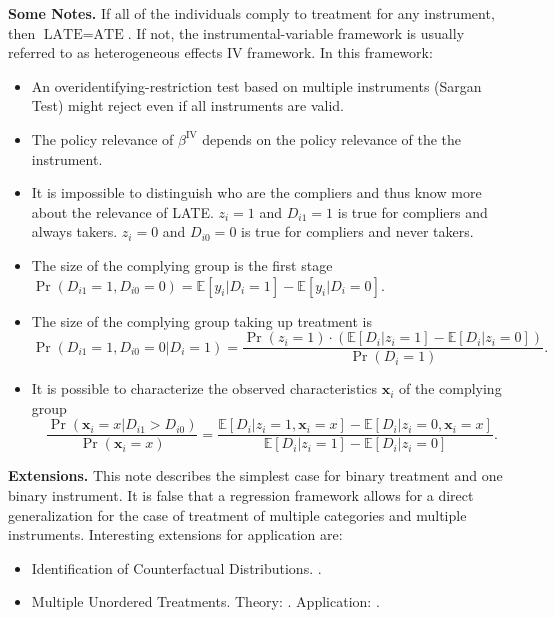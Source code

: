 \noindent \textbf{Some Notes.} If all of the individuals comply to treatment for any instrument, then $\text{LATE} =\text{ATE}$. If not, the instrumental-variable framework is usually referred to as heterogeneous effects IV framework. In this framework: 
\begin{itemize}
\item An overidentifying-restriction test based on multiple instruments (Sargan Test) might reject even if all instruments are valid. 
\item The policy relevance of $\beta^{\text{IV}}$ depends on the policy relevance of the the instrument. 
\item It is impossible to distinguish who are the compliers and thus know more about the relevance of LATE. $z_{i} = 1$ and $D_{i1} = 1$ is true for compliers and always takers. $z_{i} = 0$ and $D_{i0} = 0$ is true for compliers and never takers.
\item The size of the complying group is the first stage $\Pr \left( D_{i1} = 1, D_{i0} = 0 \right) = \mathbb{E} \left[ y_{i} | D_{i} = 1 \right] - \mathbb{E} \left[ y_{i} | D_{i} = 0 \right]$. 
\item The size of the complying group taking up treatment is 
\begin{equation}
\Pr \left( D_{i1} = 1, D_{i0} = 0 | D_{i} = 1 \right) = \frac{  \Pr \left( z_{i} = 1 \right) \cdot  \left( \mathbb{E} \left[ D_{i} | z_{i} = 1 \right] - \mathbb{E} \left[ D_{i} | z_{i} = 0 \right] \right)  }{ \Pr \left( D_{i} = 1 \right) }. 
\end{equation}
\item It is possible to characterize the observed characteristics $\bm{x}_i$ of the complying group 
\begin{equation}
\frac{\Pr \left( \bm{x}_i = x | D_{i1} > D_{i0} \right)} { \Pr \left( \bm{x}_i = x \right) }= \frac{\mathbb{E} \left[ D_{i} | z_{i} = 1, \bm{x}_i = x \right] - \mathbb{E} \left[ D_{i} | z_{i} = 0, \bm{x}_i = x \right]}{ \mathbb{E} \left[ D_{i} | z_{i} = 1 \right] - \mathbb{E} \left[ D_{i} | z_{i} = 0 \right] }. 
\end{equation}
\end{itemize}  

\noindent \textbf{Extensions.} This note describes the simplest case for binary treatment and one binary instrument. It is false that a regression framework allows for a direct generalization for the case of treatment of multiple categories and multiple instruments. Interesting extensions for application are: 

\begin{itemize} 
\item Identification of Counterfactual Distributions. \citet{imbens_estimating_1997}.
\item Multiple Unordered Treatments. Theory: \citet{heckman_unordered_2018}. Application: \citet{kirkeboen_field_2016}. 
\end{itemize} 

\singlespacing


